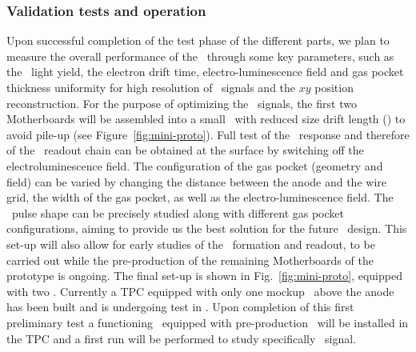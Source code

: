 \subsubsection{Validation tests and operation}

Upon successful completion of the test phase of the different parts, we plan to measure the overall performance of the \DSps\ through some key parameters, such as the \SOne\ light yield, the electron drift time, electro-luminescence field and gas pocket thickness uniformity for high resolution of \STwo\ signals and the $x y$ position reconstruction. For the purpose of optimizing the \STwo\ signals, the first two Motherboards will be assembled into a small \TPC\ with reduced size drift length (\DSpZeroDriftLength) to avoid pile-up (see Figure~\ref{fig:mini-proto}). Full test of the \SOne\ response and therefore of the \SiPM\ readout chain can be obtained at the surface by switching off the electroluminescence field. The configuration of the gas pocket (geometry and field) can be varied by changing the distance between the anode and the wire grid, the width of the gas pocket, as well as the electro-luminescence field. The \STwo\ pulse shape can be precisely studied along with different gas pocket configurations, aiming to provide us the best solution for the future \LArTPC\ design.  This set-up will also allow for early studies of the \STwo\ formation and readout, to be carried out while the pre-production of the remaining Motherboards of the prototype is ongoing. The final set-up is shown in Fig.~\ref{fig:mini-proto}, equipped with two \DSkMBs. Currently a TPC equipped with only one mockup \DSkMB\ above the anode has been built and is undergoing test in \LAr. Upon completion of this first preliminary test a functioning \DSkMB\ equipped with pre-production \DSkPdms\ will be installed in the TPC and a first run will be performed to study specifically \STwo\ signal.

